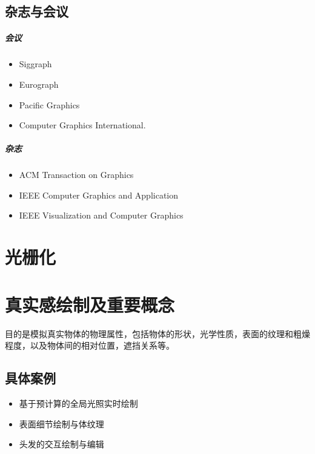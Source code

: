 \documentclass[UTF8,a4paper,12pt]{ctexbook}
\begin{document}
	\section{杂志与会议}
		\paragraph{会议}
		\begin{itemize}
			\item Siggraph 
			\item Eurograph
			\item Pacific Graphics
			\item Computer Graphics International.
		\end{itemize}
		
		\paragraph{杂志}
			\begin{itemize}
				\item ACM Transaction on Graphics
				\item IEEE Computer Graphics and Application
				\item IEEE Visualization and Computer Graphics
			\end{itemize}

\chapter{光栅化}
	



\chapter{真实感绘制及重要概念}
	目的是模拟真实物体的物理属性，包括物体的形状，光学性质，表面的纹理和粗燥程度，以及物体间的相对位置，遮挡关系等。
	

	\section{具体案例}
		\begin{itemize}
			\item 基于预计算的全局光照实时绘制
			\item 表面细节绘制与体纹理
			\item 头发的交互绘制与编辑
		\end{itemize}
	
\end{document}
